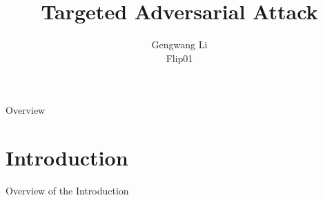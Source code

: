 \documentclass[
 size=12pt,
 paper=smartboard, %
 mode=present, %
 display=slides, %
style=tuliplab,
pauseslide,
fleqn,leqno]{powerdot}
\title{Targeted Adversarial Attack}
\author{
Gengwang Li
\\
Flip01
}
\date{\gitCommitterDate}
\begin{document}
\maketitle 

\begin{slide}[toc=,bm=]{Overview}
\tableofcontents[content=sections]
\end{slide}


\section{Introduction}

\begin{slide}[toc=,bm=]{Overview of the Introduction}
\tableofcontents[content=currentsection,type=0]
\end{slide}
\end{document}
